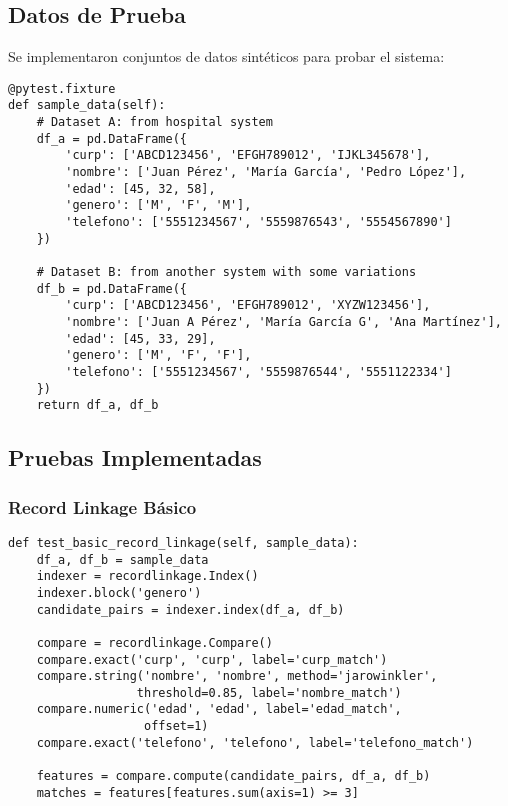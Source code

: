 \documentclass[12pt]{article}
\begin{document}
\subsection{Datos de Prueba}
Se implementaron conjuntos de datos sintéticos para probar el sistema:

\begin{lstlisting}[caption=Datos de prueba para record linkage]
@pytest.fixture
def sample_data(self):
    # Dataset A: from hospital system
    df_a = pd.DataFrame({
        'curp': ['ABCD123456', 'EFGH789012', 'IJKL345678'],
        'nombre': ['Juan Pérez', 'María García', 'Pedro López'],
        'edad': [45, 32, 58],
        'genero': ['M', 'F', 'M'],
        'telefono': ['5551234567', '5559876543', '5554567890']
    })
    
    # Dataset B: from another system with some variations
    df_b = pd.DataFrame({
        'curp': ['ABCD123456', 'EFGH789012', 'XYZW123456'],
        'nombre': ['Juan A Pérez', 'María García G', 'Ana Martínez'],
        'edad': [45, 33, 29],
        'genero': ['M', 'F', 'F'],
        'telefono': ['5551234567', '5559876544', '5551122334']
    })
    return df_a, df_b
\end{lstlisting}

\subsection{Pruebas Implementadas}

\subsubsection{Record Linkage Básico}
\begin{lstlisting}[caption=Prueba de record linkage básico]
def test_basic_record_linkage(self, sample_data):
    df_a, df_b = sample_data
    indexer = recordlinkage.Index()
    indexer.block('genero')
    candidate_pairs = indexer.index(df_a, df_b)
    
    compare = recordlinkage.Compare()
    compare.exact('curp', 'curp', label='curp_match')
    compare.string('nombre', 'nombre', method='jarowinkler', 
                  threshold=0.85, label='nombre_match')
    compare.numeric('edad', 'edad', label='edad_match', 
                   offset=1)
    compare.exact('telefono', 'telefono', label='telefono_match')
    
    features = compare.compute(candidate_pairs, df_a, df_b)
    matches = features[features.sum(axis=1) >= 3]
\end{lstlisting}
\end{document}
